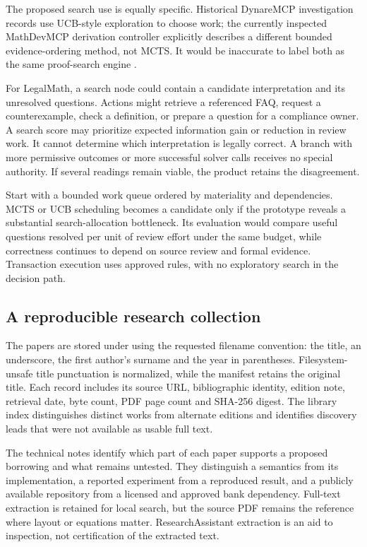\documentclass[12pt,a4paper,oneside,openany]{book}
\begin{document}
The proposed search use is equally specific. Historical DynareMCP investigation
records use UCB-style exploration to choose work; the currently inspected
MathDevMCP derivation controller explicitly describes a different bounded
evidence-ordering method, not MCTS. It would be inaccurate to label both as the
same proof-search engine \citep{localrepos}.

For LegalMath, a search node could contain a candidate interpretation and its
unresolved questions. Actions might retrieve a referenced FAQ, request a
counterexample, check a definition, or prepare a question for a compliance owner.
A search score may prioritize expected information gain or reduction in review
work. It cannot determine which interpretation is legally correct. A branch with
more permissive outcomes or more successful solver calls receives no special
authority. If several readings remain viable, the product retains the disagreement.

Start with a bounded work queue ordered by materiality and dependencies. MCTS or
UCB scheduling becomes a candidate only if the prototype reveals a substantial
search-allocation bottleneck. Its evaluation would compare useful questions
resolved per unit of review effort under the same budget, while correctness
continues to depend on source review and formal evidence. Transaction execution
uses approved rules, with no exploratory search in the decision path.



\subsection{A reproducible research collection}
\label{merge:P-05-evidence:02}


The papers are stored under  using the requested filename
convention: the title, an underscore, the first author's surname and the year in
parentheses. Filesystem-unsafe title punctuation is normalized, while the manifest
retains the original title. Each
record includes its source URL, bibliographic identity, edition note, retrieval
date, byte count, PDF page count and SHA-256 digest. The library index distinguishes
distinct works from alternate editions and identifies discovery leads that were
not available as usable full text.

The technical notes identify which part of each paper supports a proposed
borrowing and what remains untested. They distinguish a semantics from its
implementation, a reported experiment from a reproduced result, and a publicly
available repository from a licensed and approved bank dependency. Full-text
extraction is retained for local search, but the source PDF remains the reference
where layout or equations matter. ResearchAssistant extraction is an aid to
inspection, not certification of the extracted text.
\end{document}
